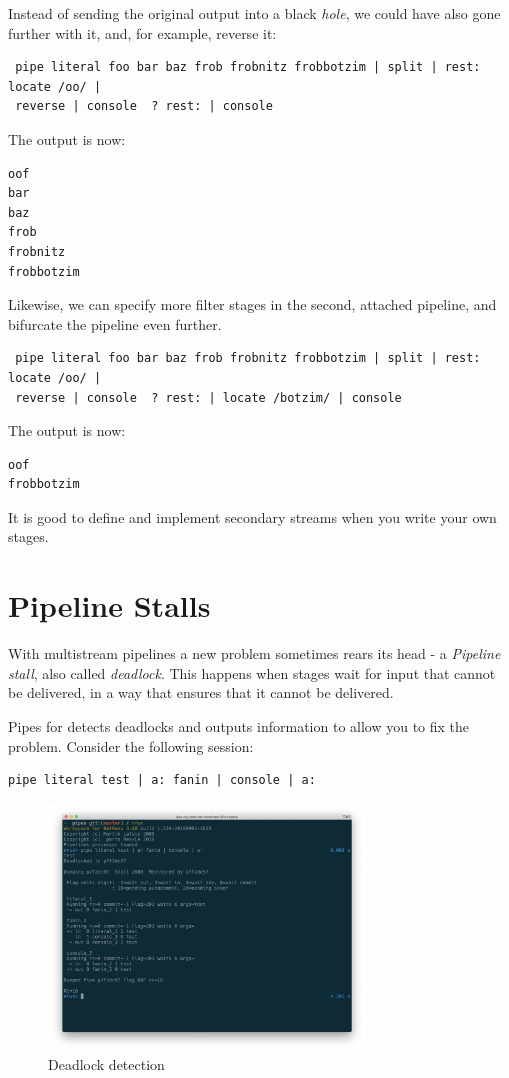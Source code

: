 Instead of sending the original output into a black \emph{hole}, we
could have also gone further with it, and, for example, reverse it:
\begin{lstlisting}
 pipe literal foo bar baz frob frobnitz frobbotzim | split | rest: locate /oo/ |
 reverse | console  ? rest: | console
\end{lstlisting}
The output is now:
\begin{verbatim}
oof
bar
baz
frob
frobnitz
frobbotzim
\end{verbatim}
Likewise, we can specify more filter stages in the second, attached
pipeline, and bifurcate the pipeline even further.

\begin{lstlisting}
 pipe literal foo bar baz frob frobnitz frobbotzim | split | rest: locate /oo/ |
 reverse | console  ? rest: | locate /botzim/ | console
\end{lstlisting}
The output is now:
\begin{verbatim}
oof
frobbotzim
\end{verbatim}




It is good to define and implement secondary streams when you write
your own stages.


\chapter{Pipeline Stalls}
With multistream pipelines a new problem sometimes rears its head - a \emph{Pipeline stall}, also called \emph{deadlock}. This happens when stages
wait for input that cannot be delivered, in a way that ensures that it
cannot be delivered.

Pipes for \nr{} detects deadlocks and outputs information to allow you to fix the problem.  Consider the following session:
\begin{lstlisting}
pipe literal test | a: fanin | console | a:
\end{lstlisting}

\begin{figure}[h]
  \includegraphics[width=0.75\textwidth]{images/deadlock.png}
  \caption{Deadlock detection}
  \label{fig:tcpcompile}
\end{figure}

